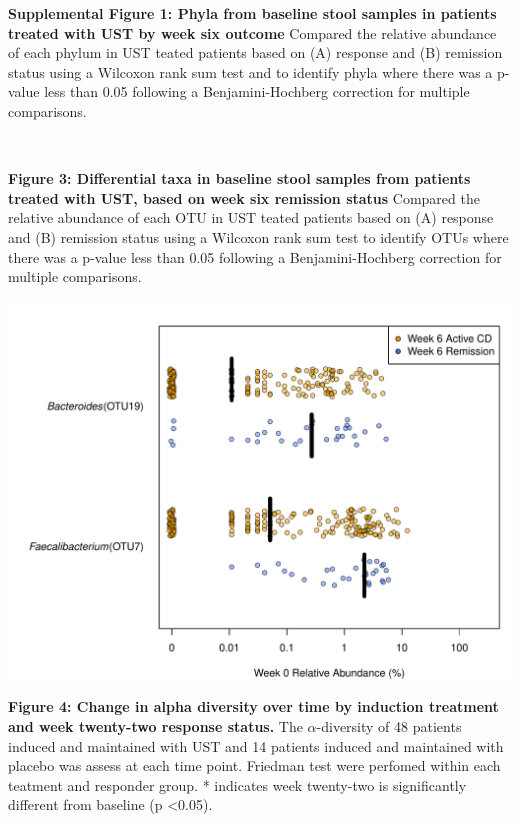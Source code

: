 \documentclass[11pt,]{article}
\begin{document}
\newpage

\textbf{Supplemental Figure 1: Phyla from baseline stool samples in
patients treated with UST by week six outcome} Compared the relative
abundance of each phylum in UST teated patients based on (A) response
and (B) remission status using a Wilcoxon rank sum test and to identify
phyla where there was a p-value less than 0.05 following a
Benjamini-Hochberg correction for multiple comparisons.

\includegraphics{figures/SF1_wk6phyla.pdf}

\newpage

\textbf{Figure 3: Differential taxa in baseline stool samples from
patients treated with UST, based on week six remission status} Compared
the relative abundance of each OTU in UST teated patients based on (A)
response and (B) remission status using a Wilcoxon rank sum test to
identify OTUs where there was a p-value less than 0.05 following a
Benjamini-Hochberg correction for multiple comparisons.

\includegraphics{figures/Figure3_basesigOTUabund.REMISSwk6.pdf}

\newpage

\textbf{Figure 4: Change in alpha diversity over time by induction
treatment and week twenty-two response status.} The
\({\alpha}\)-diversity of 48 patients induced and maintained with UST
and 14 patients induced and maintained with placebo was assess at each
time point. Friedman test were perfomed within each teatment and
responder group. * indicates week twenty-two is significantly different
from baseline (p \textless{}0.05).
\end{document}
